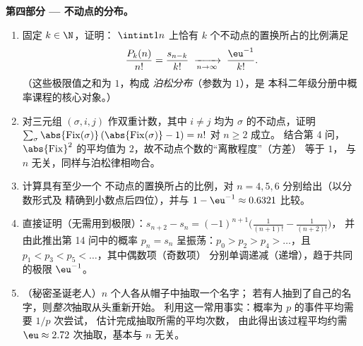 \begin{problem}
\medskip
\noindent\textbf{第四部分 --- 不动点的分布。}
\begin{enumerate}[resume]
  \item 固定 $k \in \N$，证明：
        $\intint1n$ 上恰有 $k$ 个不动点的置换所占的比例满足
        \[
        \frac{P_k(n)}{n!} = \frac{s_{n-k}}{k!}
        \;\xrightarrow[n \to \infty]{}\; \frac{\eu^{-1}}{k!} .
        \]
        （这些极限值之和为 $1$，构成
        \emph{泊松分布}（参数为 $1$），是
        本科二年级分册中概率课程的核心对象。）
  \item 对三元组 $(\sigma, i, j)$ 作双重计数，其中 $i
        \neq j$ 均为 $\sigma$ 的不动点，证明
        $\sum_\sigma \abs{\mathrm{Fix}(\sigma)}\,
        (\abs{\mathrm{Fix}(\sigma)} - 1) = n!$ 对 $n \geq 2$ 成立。
        结合第 4 问，$\abs{\mathrm{Fix}}^2$ 的平均值为
        $2$，故不动点个数的“离散程度”（方差）
        等于 $1$，
        与 $n$ 无关，同样与泊松律相吻合。
  \item 计算具有至少一个
        不动点的置换所占的比例，对 $n = 4, 5, 6$ 分别给出（以分数形式及
        精确到小数点后四位），并与 $1 - \eu^{-1} \approx
        0.6321$ 比较。
  \item 直接证明（无需用到极限）：$s_{n+2} - s_n
        = (-1)^{n+1}\bigl(\frac1{(n+1)!} - \frac1{(n+2)!}\bigr)$，
        并由此推出第 14 问中的概率 $p_n = s_n$
        呈振荡：$p_0 > p_2 > p_4 > \dots$，且
        $p_1 < p_3 < p_5 < \dots$，其中偶数项（奇数项）
        分别单调递减（递增），趋于共同的极限
        $\eu^{-1}$。
  \item （秘密圣诞老人）$n$ 个人各从帽子中抽取一个名字；
        若有人抽到了自己的名字，则\emph{整次}抽取从头重新开始。
        利用这一常用事实：概率为
        $p$ 的事件平均需要 $1/p$ 次尝试，
        估计完成抽取所需的平均次数，
        由此得出该过程平均约需 $\eu \approx
        2.72$ 次抽取，基本与
        $n$ 无关。
\end{enumerate}


\end{problem}
